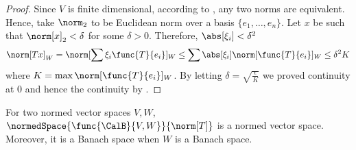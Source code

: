 \begin{proof}
    Since \(V\) is finite dimensional, according to , any two norms are equivalent. Hence, take \(\norm_2\) to be Euclidean norm over a basis \(\{e_1, \dots , e_n\}\). Let \(x\) be such that \(\norm[x]_2 < \delta\) for some \(\delta > 0\). Therefore, \(\abs[\xi_i] < \delta^2\)
    \begin{equation*}
        \norm[Tx]_W = \norm[\sum \xi_i \func{T}{e_i}]_W \leq \sum \abs[\xi_i] \norm[\func{T}{e_i}]_W \leq \delta^2 K
    \end{equation*}
    where \(K = \max \norm[\func{T}{e_i}]_W \). By letting \(\delta = \sqrt{\frac{\epsilon}{K}}\) we proved continuity at \(0\) and hence the continuity by .
\end{proof}

\begin{theorem}
    For two normed vector spaces \(V,W\), \(\normedSpace{\func{\CalB}{V,W}}{\norm[T]}\) is a normed vector space. Moreover, it is a Banach space when \(W\) is a Banach space.
\end{theorem}


